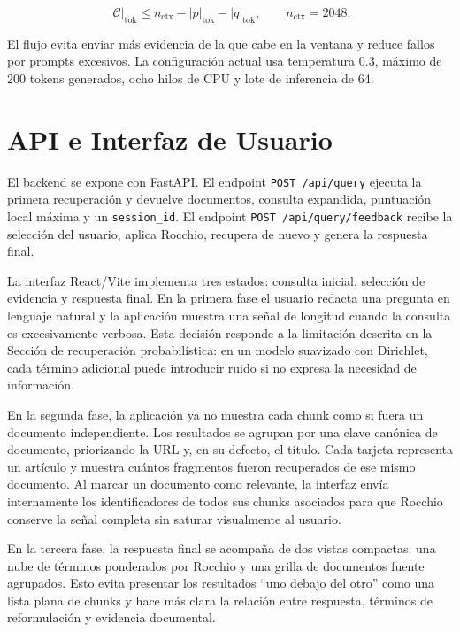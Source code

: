 \documentclass[a4paper]{llncs}
\begin{document}
\begin{equation}
|\mathcal{C}|_{\mathrm{tok}}
\leq
n_{\mathrm{ctx}}-|p|_{\mathrm{tok}}-|q|_{\mathrm{tok}},
\qquad n_{\mathrm{ctx}}=2048.
\end{equation}

El flujo evita enviar más evidencia de la que cabe en la ventana y reduce fallos por prompts excesivos. La configuración actual usa temperatura 0.3, máximo de 200 tokens generados, ocho hilos de CPU y lote de inferencia de 64.

\section{API e Interfaz de Usuario}

El backend se expone con FastAPI. El endpoint \texttt{POST /api/query} ejecuta la primera recuperación y devuelve documentos, consulta expandida, puntuación local máxima y un \texttt{session\_id}. El endpoint \texttt{POST /api/query/feedback} recibe la selección del usuario, aplica Rocchio, recupera de nuevo y genera la respuesta final.

La interfaz React/Vite implementa tres estados: consulta inicial, selección de evidencia y respuesta final. En la primera fase el usuario redacta una pregunta en lenguaje natural y la aplicación muestra una señal de longitud cuando la consulta es excesivamente verbosa. Esta decisión responde a la limitación descrita en la Sección de recuperación probabilística: en un modelo suavizado con Dirichlet, cada término adicional puede introducir ruido si no expresa la necesidad de información.

En la segunda fase, la aplicación ya no muestra cada chunk como si fuera un documento independiente. Los resultados se agrupan por una clave canónica de documento, priorizando la URL y, en su defecto, el título. Cada tarjeta representa un artículo y muestra cuántos fragmentos fueron recuperados de ese mismo documento. Al marcar un documento como relevante, la interfaz envía internamente los identificadores de todos sus chunks asociados para que Rocchio conserve la señal completa sin saturar visualmente al usuario.

En la tercera fase, la respuesta final se acompaña de dos vistas compactas: una nube de términos ponderados por Rocchio y una grilla de documentos fuente agrupados. Esto evita presentar los resultados ``uno debajo del otro'' como una lista plana de chunks y hace más clara la relación entre respuesta, términos de reformulación y evidencia documental.
\end{document}
